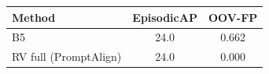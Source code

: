 \begin{tabular}{lcc}
\toprule
Method & EpisodicAP & OOV-FP \\
\midrule
B5 & 24.0 & 0.662 \\
RV full (PromptAlign) & 24.0 & 0.000 \\
\bottomrule
\end{tabular}
